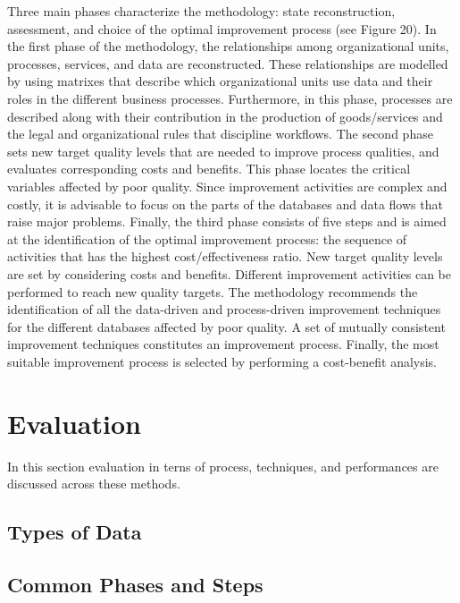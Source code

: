 \documentclass[pdftex,english,oribibl]{llncs}
\begin{document}
    Three main phases characterize the methodology: state reconstruction, assessment, and choice of the optimal improvement process (see Figure 20).
    In the first phase of the methodology, the relationships among organizational units, processes, services, and data are reconstructed.
    These relationships are modelled by using matrixes that describe which organizational units use data and their roles in the different business processes.
    Furthermore, in this phase, processes are described along with their contribution in the production of goods/services and the legal and organizational rules that discipline workflows.
    The second phase sets new target quality levels that are needed to improve process qualities, and evaluates corresponding costs and benefits.
    This phase locates the critical variables affected by poor quality. Since improvement activities are complex and costly, it is advisable to focus on the parts of the databases and data flows that raise major problems.
    Finally, the third phase consists of five steps and is aimed at the identification of the optimal improvement process: the sequence of activities that has the highest cost/effectiveness ratio.
    New target quality levels are set by considering costs and benefits. Different improvement activities can be performed to reach new quality targets.
    The methodology recommends the identification of all the data-driven and process-driven improvement techniques for the different databases affected by poor quality.
    A set of mutually consistent improvement techniques constitutes an improvement process.
    Finally, the most suitable improvement process is selected by performing a cost-benefit analysis.

    \section{Evaluation}
    In this section evaluation in terns of process, techniques, and performances are discussed across these methods.
    \subsection{Types of Data}

    \subsection{Common Phases and Steps}
\end{document}
